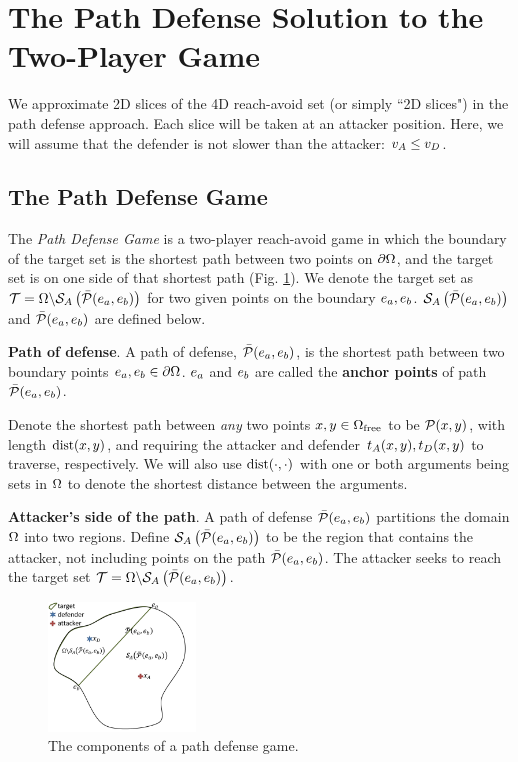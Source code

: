\section{The Path Defense Solution to the Two-Player Game}
\label{sec:path_defense}
We approximate 2D slices of the 4D reach-avoid set (or simply ``2D slices") in the path defense approach. Each slice will be taken at an attacker position. Here, we will assume that the defender is not slower than the attacker: $v_A \leq v_D$. 

\subsection{The Path Defense Game}
\label{subsec:pd_game}
The \textit{Path Defense Game} is a two-player reach-avoid game in which the boundary of the target set is the shortest path between two points on $\partial\Omega$, and the target set is on one side of that shortest path (Fig. \ref{fig:pd_form}). We denote the target set as $\mathcal{T}=\Omega\backslash\mathcal{S}_A\left(\bar{\mathcal{P}}(e_a,e_b)\right)$ for two given points on the boundary $e_a,e_b$. $\mathcal{S}_A\left(\bar{\mathcal{P}}(e_a,e_b)\right)$ and $\bar{\mathcal{P}}(e_a,e_b)$ are defined below. 

\begin{defn} %
\textbf{Path of defense}. A path of defense, $\bar{\mathcal{P}}(e_a,e_b)$, is the shortest path between two boundary points $e_a,e_b\in\partial\Omega$. $e_a$ and $e_b$ are called the \textbf{anchor points} of path $\bar{\mathcal{P}}(e_a,e_b)$. 
\end{defn}

Denote the shortest path between \textit{any} two points $x,y\in\Omega_{\text{free}}$ to be $\mathcal{P}(x,y)$, with length $\text{dist}(x,y)$, and requiring the attacker and defender $t_A(x, y),t_D(x,y)$ to traverse, respectively. We will also use $\text{dist}(\cdot,\cdot)$ with one or both arguments being sets in $\Omega$ to denote the shortest distance between the arguments.

\begin{defn} %
\textbf{Attacker's side of the path}. A path of defense $\bar{\mathcal{P}}(e_a,e_b)$ partitions the domain $\Omega$ into two regions. Define $\mathcal{S}_A\left(\bar{\mathcal{P}}(e_a,e_b)\right)$ to be the region that contains the attacker, not including points on the path $\bar{\mathcal{P}}(e_a,e_b)$. The attacker seeks to reach the target set $\mathcal{T}=\Omega\backslash\mathcal{S}_A\left(\bar{\mathcal{P}}(e_a,e_b)\right)$.
\end{defn}

\begin{figure}
\centering
\includegraphics[width=0.35\textwidth]{"fig/path defense game"}
\caption{The components of a path defense game.}
\label{fig:pd_form}
\end{figure}


